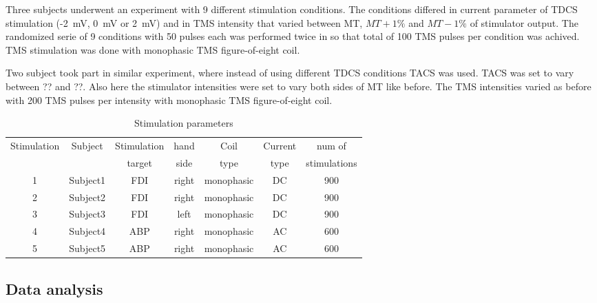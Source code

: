 \documentclass[english,12pt,a4paper,dvips]{article}
\begin{document}
Three subjects underwent an experiment with 9 different stimulation conditions. The conditions differed in current parameter of TDCS stimulation (-2~mV, 0~mV or 2~mV) and in TMS intensity that varied between MT, $MT + 1\%$ and $MT - 1\%$ of stimulator output. The randomized serie of 9 conditions with 50 pulses each was performed twice in so that total of 100 TMS pulses per condition was achived. TMS stimulation was done with monophasic TMS figure-of-eight coil.

Two subject took part in similar experiment, where instead of using different TDCS conditions TACS was used. TACS was set to vary between ?? and ??. Also here the stimulator intensities were set to vary both sides of MT like before. The TMS intensities varied as before with 200 TMS pulses per intensity with monophasic TMS figure-of-eight coil.






\begin{table}[ht!]
  \begin{center}
    \begin{tabular}{c c c c c c c}
    \hline
    Stimulation & Subject & Stimulation & hand  &Coil & Current  & num of \\
     & & target & side &type & type & stimulations \\
    \hline
    1 & Subject1 & FDI & right & monophasic & DC & 900\\
    2 & Subject2 & FDI & right & monophasic & DC & 900\\
    3 & Subject3 & FDI & left  & monophasic & DC & 900\\
    4 & Subject4 & ABP & right & monophasic & AC & 600\\
    5 & Subject5 & ABP & right & monophasic & AC & 600\\
    \hline
    \end{tabular}
  \end{center}
  \caption{Stimulation parameters}
\end{table}








\subsection{Data analysis}
\end{document}
